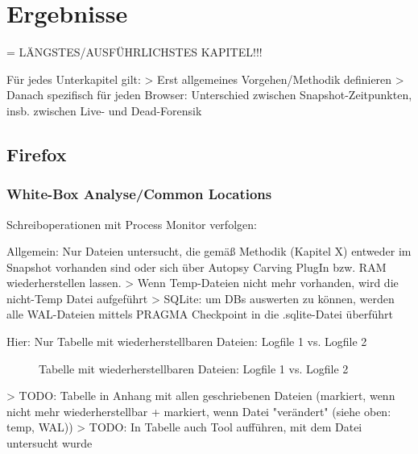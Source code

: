 \chapter{Ergebnisse}

= LÄNGSTES/AUSFÜHRLICHSTES KAPITEL!!!

Für jedes Unterkapitel gilt: 
> Erst allgemeines Vorgehen/Methodik definieren
> Danach spezifisch für jeden Browser: Unterschied zwischen Snapshot-Zeitpunkten, insb. zwischen Live- und Dead-Forensik

\section{Firefox}

\subsection*{White-Box Analyse/Common Locations}

Schreiboperationen mit Process Monitor verfolgen:

Allgemein: Nur Dateien untersucht, die gemäß Methodik (Kapitel X) entweder im Snapshot vorhanden sind oder sich über Autopsy Carving PlugIn bzw. RAM wiederherstellen lassen.
> Wenn Temp-Dateien nicht mehr vorhanden, wird die nicht-Temp Datei aufgeführt
> SQLite: um DBs auswerten zu können, werden alle WAL-Dateien mittels PRAGMA Checkpoint in die .sqlite-Datei überführt

Hier: Nur Tabelle mit wiederherstellbaren Dateien: Logfile 1 vs. Logfile 2
\begin{figure}[h!]
	\caption{Tabelle mit wiederherstellbaren Dateien: Logfile 1 vs. Logfile 2}
\end{figure}


> TODO: Tabelle in Anhang mit allen geschriebenen Dateien (markiert, wenn nicht mehr wiederherstellbar + markiert, wenn Datei "verändert" (siehe oben: temp, WAL))
> TODO: In Tabelle auch Tool aufführen, mit dem Datei untersucht wurde

